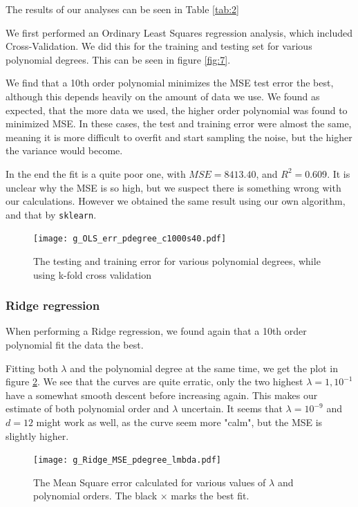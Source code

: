 \documentclass[a4paper,10pt,english]{article}
\def\code#1{\texttt{#1}} %
\begin{document}
The results of our analyses can be seen in Table \ref{tab:2}

We first performed an Ordinary Least Squares regression analysis, which included Cross-Validation. We did this for the training and testing set for various polynomial degrees. This can be seen in figure \ref{fig:7}.

We find that a 10th order polynomial minimizes the MSE test error the best, although this depends heavily on the amount of data we use. We found as expected, that the more data we used, the higher order polynomial was found to minimized MSE. In these cases, the test and training error were almost the same, meaning it is more difficult to overfit and start sampling the noise, but the higher the variance would become.

In the end the fit is a quite poor one, with $MSE=8413.40$, and  $R^2=0.609$. It is unclear why the MSE is so high, but we suspect there is something wrong with our calculations. However we obtained the same result using our own algorithm, and that by \code{sklearn}.
\begin{figure}[H]
	\centering
	\texttt{[image: g\_OLS\_err\_pdegree\_c1000s40.pdf]}
	\caption{The testing and training error for various polynomial degrees, while using k-fold cross validation}
	\label{fig:10}
\end{figure}


\subsubsection{Ridge regression}
When performing a Ridge regression, we found again that a 10th order polynomial fit the data the best.

Fitting both $\lambda$ and the polynomial degree at the same time, we get the plot in figure \ref{fig:11}. We see that the curves are quite erratic, only the two highest $\lambda=1, 10^{-1}$ have a somewhat smooth descent before increasing again. This makes our estimate of both polynomial order and $\lambda$ uncertain. It seems that $\lambda=10^{-9}$ and $d=12$ might work as well, as the curve seem more "calm", but the MSE is slightly higher. 


\begin{figure}[H]
	\centering
	\texttt{[image: g\_Ridge\_MSE\_pdegree\_lmbda.pdf]}
	\caption{The Mean Square error calculated for various values of $\lambda$ and polynomial orders. The black $\times$ marks the best fit.}
	\label{fig:11}
\end{figure}
\end{document}
